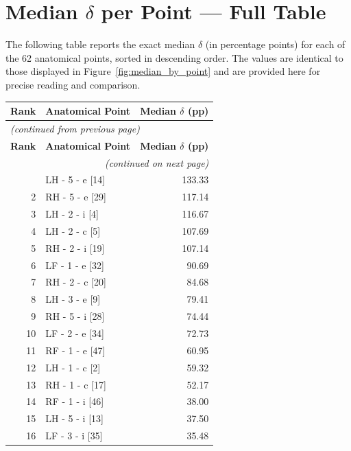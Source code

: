 \documentclass[11pt,a4paper]{article}
\begin{document}
\newpage

\section{Median \texorpdfstring{$\delta$}{delta} per Point --- Full Table}

The following table reports the exact median $\delta$ (in percentage points)
for each of the 62 anatomical points, sorted in descending order.
The values are identical to those displayed in Figure~\ref{fig:median_by_point}
and are provided here for precise reading and comparison.

\bigskip

\begin{longtable}{@{}rlr@{}}
\toprule
\textbf{Rank} & \textbf{Anatomical Point} & \textbf{Median $\delta$ (pp)} \\
\midrule
\endfirsthead
\multicolumn{3}{l}{\small\itshape (continued from previous page)} \\
\toprule
\textbf{Rank} & \textbf{Anatomical Point} & \textbf{Median $\delta$ (pp)} \\
\midrule
\endhead
\midrule
\multicolumn{3}{r}{\small\itshape (continued on next page)} \\
\endfoot
\bottomrule
\endlastfoot
    1 & LH - 5 - e [14] & 133.33 \\
    2 & RH - 5 - e [29] & 117.14 \\
    3 & LH - 2 - i [4] & 116.67 \\
    4 & LH - 2 - c [5] & 107.69 \\
    5 & RH - 2 - i [19] & 107.14 \\
    6 & LF - 1 - e [32] & 90.69 \\
    7 & RH - 2 - c [20] & 84.68 \\
    8 & LH - 3 - e [9] & 79.41 \\
    9 & RH - 5 - i [28] & 74.44 \\
    10 & LF - 2 - e [34] & 72.73 \\
    11 & RF - 1 - e [47] & 60.95 \\
    12 & LH - 1 - c [2] & 59.32 \\
    13 & RH - 1 - c [17] & 52.17 \\
    14 & RF - 1 - i [46] & 38.00 \\
    15 & LH - 5 - i [13] & 37.50 \\
    16 & LF - 3 - i [35] & 35.48 \\

\end{longtable}
\end{document}
